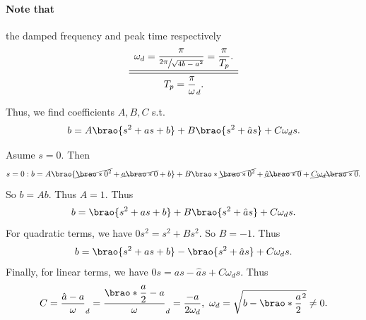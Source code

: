 \documentclass[12pt]{article}
\DeclarePairedDelimiter\brao()%
\begin{document}
\begin{enumerate}[(a)]
        \paragraph{Note that} the damped frequency and peak time respectively
        \begin{equation}\label{eq: w to-from Tp}
            \begin{array}{c}
            \displaystyle
                \omega_d = \frac\pi{\sfrac{2\pi}{\sqrt{4b - a^2}}} = \frac\pi{T_p}.
            \\*
            \midrule\midrule
            \displaystyle
                T_p = \frac\pi\omega_d.
            \\*
            \end{array}
        \end{equation}

        Thus, we find coefficients $A,B,C$ s.t.
        \begin{equation}
            b = A\brao{s^2 + as + b} + B\brao{s^2 + \hat{a}s} + C\omega_d s.
        \end{equation}

        Asume $s = 0$. Then
        \begin{equation}
            s = 0: b = A\brao{\cancel{\brao*0^2} + \cancel{a\brao*0} + b} + B\brao*{\cancel{\brao*0^2} + \cancel{\hat{a}\brao*0}} + \cancel{C\omega_d \brao*0}.
        \end{equation}
        So $b = Ab$. Thus $A = 1$. Thus
        \begin{equation}
            b = \brao{s^2 + as + b} + B\brao{s^2 + \hat{a}s} + C\omega_d s.
        \end{equation}
        For quadratic terms, we have $0s^2 = s^2 + Bs^2$. So $B = -1$. Thus
        \begin{equation}
            b = \brao{s^2 + as + b} - \brao{s^2 + \hat{a}s} + C\omega_d s.
        \end{equation}
        Finally, for linear terms, we have $0s = as - \hat{a}s + C\omega_d s$. Thus
        \begin{equation}
            C = \frac{\hat{a} - a}\omega_d
            = \frac{\displaystyle\brao*{\frac{a}2} - a}\omega_d
            = \frac{-a}{2\omega_d},\ 
            \omega_d = \sqrt{b - \brao*{\frac{a}2}^2} \not= 0.
        \end{equation}


\end{enumerate}
\end{document}
